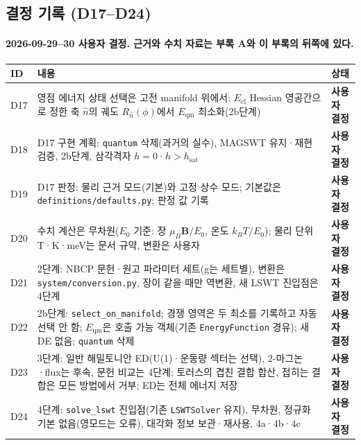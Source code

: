 \subsection{결정 기록 (D17--D24)}\label{decisions-selection}
\begingroup%
  \framesubtitle{2026-09-29--30 사용자 결정. 근거와 수치 자료는 부록 A와 이 부록의 뒤쪽에 있다.}
  \footnotesize\renewcommand{\arraystretch}{1.08}
  \begin{tabularx}{\textwidth}{@{}p{0.7cm}YP{2.5cm}@{}}
    \toprule
    ID & 내용 & 상태 \\
    \midrule
    D17 & 영점 에너지 상태 선택은 고전 manifold 위에서: $E_{\mathrm{cl}}$ Hessian 영공간으로 정한 축 $\hat n$의 궤도 $R_{\hat n}(\phi)$에서 $E_{\mathrm{qm}}$ 최소화(2b단계) & \textbf{사용자 결정} \\
    D18 & D17 구현 계획: \texttt{quantum} 삭제(과거의 실수), MAGSWT 유지·재현 검증, 2b단계, 삼각격자 $h=0$·$h>h_{\mathrm{sat}}$ & \textbf{사용자 결정} \\
    D19 & D17 판정: 물리 근거 모드(기본)와 고정 상수 모드; 기본값은 \texttt{definitions/defaults.py}; 판정 값 기록 & \textbf{사용자 결정} \\
    D20 & 수치 계산은 무차원($E_0$ 기준: 장 $\mu_B\mathbf B/E_0$, 온도 $k_BT/E_0$); 물리 단위 T·K·meV는 문서 규약, 변환은 사용자 & \textbf{사용자 결정} \\
    D21 & 2단계: NBCP 문헌·원고 파라미터 세트(g는 세트별), 변환은 \texttt{system/conversion.py}, 장이 같을 때만 역변환, 새 LSWT 진입점은 4단계 & \textbf{사용자 결정} \\
    D22 & 2b단계: \texttt{select\_on\_manifold}; 경쟁 영역은 두 최소를 기록하고 자동 선택 안 함; $E_{\mathrm{qm}}$은 호출 가능 객체(기존 \texttt{EnergyFunction} 경유); 새 DE 없음; \texttt{quantum} 삭제 & \textbf{사용자 결정} \\
    D23 & 3단계: 일반 해밀토니안 ED(U(1)·운동량 섹터는 선택), 2-마그논·flux는 후속, 문헌 비교는 4단계; 토러스의 겹친 결합 합산, 접히는 결합은 모든 방법에서 거부; ED는 전체 에너지 저장 & \textbf{사용자 결정} \\
    D24 & 4단계: \texttt{solve\_lswt} 진입점(기존 \texttt{LSWTSolver} 유지), 무차원, 정규화 기본 없음(영모드는 오류), 대각화 정보 보관·재사용, 4a·4b·4c & \textbf{사용자 결정} \\
    \bottomrule
  \end{tabularx}
  \par\smallskip
\endgroup


